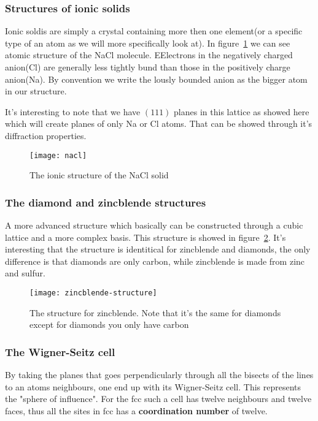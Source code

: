 \documentclass[11pt]{article}
\begin{document}
\newpage
\subsubsection{Structures of ionic solids}
Ionic soldis are simply a crystal containing more then one element(or a specific type of an atom as we will more specifically look at). In figure~\ref{fig:nacl} we can see atomic structure of the NaCl molecule.  EElectrons in the negatively charged anion(Cl) are generally less tightly bund than those in the positively charge anion(Na). By convention we write the lously bounded anion as the bigger atom in our structure. 

It's interesting to note that we have $(111)$ planes in this lattice as showed here which will create planes of only Na or Cl atoms. That can be showed through it's diffraction properties. 
\begin{figure}[H]
	\centering
	\texttt{[image: nacl]}
	\caption{The ionic structure of the NaCl solid}
	\label{fig:nacl}
\end{figure}
\newpage
\subsubsection{The diamond and zincblende structures}
A more advanced structure which basically can be constructed through a cubic lattice and a more complex basis. This structure is showed in figure~\ref{fig:zincblende-structure}. It's interesting that the structure is identitical for zincblende and diamonds, the only difference is that diamonds are only carbon, while zincblende is made from zinc and  sulfur.
\begin{figure}[H]
	\centering
	\texttt{[image: zincblende-structure]}
	\caption{The structure for zincblende. Note that it's the same for diamonds except for diamonds you only have carbon}
	\label{fig:zincblende-structure}
\end{figure}

\newpage
\subsubsection{The Wigner-Seitz cell}
By taking the planes that goes perpendicularly  through all the bisects of the lines to an atoms neighbours, one end up with its Wigner-Seitz cell. This represents the "sphere of influence". For the fcc such a cell has twelve neighbours and twelve faces, thus all the sites in fcc has a \textbf{coordination number} of twelve.
\end{document}

